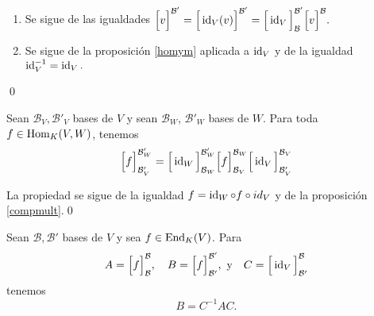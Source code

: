 \dem \begin{enumerate}
\item Se sigue de las igualdades $\Big[v\Big]^{\mathcal{B}'}=\Big[\operatorname{id}_V(v)\Big]^{\mathcal{B}'}=\Big[\operatorname{id}_V\Big]^{\mathcal{B}'}_\mathcal{B}\Big[v\Big]^{\mathcal{B}}.$ 
\item Se sigue de la proposici\'on \ref{homym} aplicada a $\operatorname{id}_V$ y de la igualdad $\operatorname{id}_V^{-1}=\operatorname{id}_V.$
\end{enumerate}
\qed

\begin{pro}
Sean $\mathcal{B}_V,\mathcal{B}'_V$ bases de $V$ y sean $\mathcal{B}_W$, $\mathcal{B}'_W$ bases de $W$. Para toda $f\in\operatorname{Hom}_K(V,W)$, tenemos
\[
\Big[ f\Big]^{\mathcal{B}_W'}_{\mathcal{B}'_V}=\Big[\operatorname{id}_W\Big]^{\mathcal{B}'_W}_{\mathcal{B}_W}\Big[ f\Big]^{\mathcal{B}_W}_{\mathcal{B}_V}\Big[\operatorname{id}_V\Big]^{\mathcal{B}_V}_{\mathcal{B}'_V}
\]
\end{pro}

\dem La propiedad se sigue de la igualdad $f=\operatorname{id}_W\circ f\circ id_V$ y de la proposici\'on \ref{compmult}.\qed

\begin{obs}
Sean $\mathcal{B},\mathcal{B}'$ bases de $V$ y sea $f\in\operatorname{End}_K(V)$. Para
\[
A=\Big[ f\Big]^{\mathcal{B}}_{\mathcal{B}},\quad B=\Big[ f\Big]^{\mathcal{B}'}_{\mathcal{B}'},\textrm{ y}\quad C=\Big[\operatorname{id}_V\Big]^{\mathcal{B}}_{\mathcal{B}'}
\]
tenemos
\[
B=C^{-1}AC.
\]
\end{obs}

